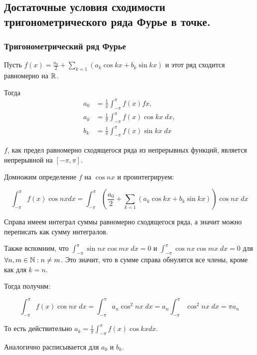 \subsection{Достаточные условия сходимости тригонометрического ряда Фурье в точке.}

\subsubsection{Тригонометрический ряд Фурье}

\Lemma Пусть $f(x) = \frac{a_0}{2} + \sum_{k=1} \left(a_k \cos kx + b_k \sin kx\right)$ и этот ряд сходится равномерно на $\mathbb{R}$.

Тогда
\begin{align*}
    a_0 &= \frac{1}{\pi} \int_{-\pi}^{\pi} f(x) fx, \\
    a_k &= \frac{1}{\pi} \int_{-\pi}^{\pi} f(x) \cos kx \;dx, \\
    b_k &= \frac{1}{\pi} \int_{-\pi}^{\pi} f(x) \sin kx \;dx
\end{align*}

\Proof

$f$, как предел равномерно сходящегося ряда из непрерывных функций, является непрерывной на $[-\pi, \pi]$.

Домножим определение $f$ на $\cos nx$ и проинтегрируем:

\begin{equation*}
    \int_{-\pi}^{\pi} f(x) \cos nx dx = \int_{-\pi}^{\pi} \left(\frac{a_0}{2} + \sum_{k=1} \left(a_k \cos kx + b_k \sin kx\right)\right) \cos nx \; dx
\end{equation*}

Справа имеем интеграл суммы равномерно сходящегося ряда, а значит можно переписать как сумму интегралов.

Также вспомним, что $\int_{-\pi}^{\pi} \sin nx \cos mx \;dx = 0$ и $\int_{-\pi}^{\pi} \cos nx \cos mx \;dx = 0$ для $\forall n, m \in \mathbb{N}: n \neq m$.
Это значит, что в сумме справа обнулятся все члены, кроме как для $k=n$.

Тогда получим:

\begin{equation*}
    \int_{-\pi}^{\pi} f(x) \cos nx \;dx = \int_{-\pi}^{\pi} a_n \cos^2 nx \; dx =  a_n \int_{-\pi}^{\pi} \cos^2 nx \; dx = \pi a_n
\end{equation*}

То есть действительно $a_k = \frac{1}{\pi} \int_{-\pi}^{\pi} f(x) \cos kx dx$.

Аналогично расписывается для $a_0$ и $b_k$.

